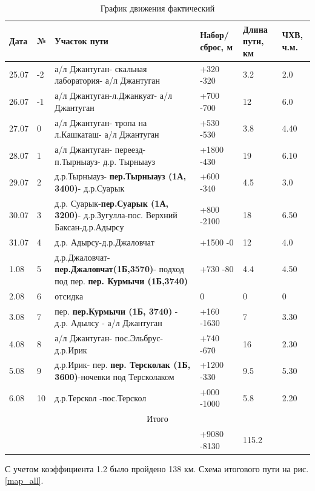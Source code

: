 \documentclass[]{article}
\begin{document}
\begin{table}[h!]
	\caption{\label{tab:grafik} График движения фактический}
	\begin{center}
		\begin{tabular}{|p{0.7cm}|p{0.3cm}|p{5cm}|p{0.9cm}|p{1cm}|p{1cm}|}
			\hline
			Дата&№& Участок пути & Набор/ сброс, м & Длина пути, км & ЧХВ, ч.м.\\ \hline
			25.07&-2&а/л Джантуган- скальная лаборатория- а/л Джантуган&+320 -320 & 3.2 & 2.0\\ \hline
			26.07&-1&а/л Джантуган-л.Джанкуат- а/л Джантуган&+700 -700 & 12 & 6.0\\ \hline
			27.07&0&а/л Джантуган- тропа на л.Кашкаташ- а/л Джантуган&+530 -530 & 3.8 & 4.40\\ \hline
			28.07&1&а/л Джантуган- переезд- п.Тырныауз- д.р. Тырныауз&+1800 -430 & 19 & 6.10\\ \hline
			29.07&2&д.р.Тырныауз- \textbf{пер.Тырныауз (1А, 3400)}- д.р.Суарык &+600 -340 & 4.5 & 3.0\\ \hline
			30.07&3&д.р. Суарык-\textbf{пер.Суарык (1А, 3200)}- д.р.Зугулла-пос. Верхний Баксан-д.р.Адырсу &+800 -2100 & 18 & 6.50\\ \hline
			31.07&4&д.р. Адырсу-д.р.Джаловчат &+1500 -0 & 12 & 4.0\\ \hline
			1.08&5&д.р.Джаловчат- \textbf{пер.Джаловчат(1Б,3570)}- подход под пер. \textbf{пер. Курмычи (1Б,3740)} &+730 -80 & 4.4 & 4.50\\ \hline
			2.08&6&отсидка &0 & 0 & 0\\ \hline
			3.08&7&пер. \textbf{пер.Курмычи (1Б, 3740)} - д.р. Адылсу - а/л Джантуган &+160 -1630 & 7 & 3.30\\ \hline
			4.08&8& а/л Джантуган- пос.Эльбрус- д.р.Ирик &+740 -670 & 16 & 2.30\\ \hline
			5.08&9& д.р.Ирик- пер. \textbf{пер. Терсколак (1Б, 3600)}-ночевки под Терсколаком  &+1200 -330 & 9.5 & 5.30\\ \hline
			6.08&10& д.р.Терскол -пос.Терскол  &+000   -1000 & 5.8 & 2.20\\ \hline
			\multicolumn{6}{|c|}{Итого} \\ \hline
			&&&	+9080 -8130 &	115.2&		 \\ \hline	
			
		\end{tabular}
	\end{center}
\end{table}
С учетом коэффициента 1.2 было пройдено 138 км.
Схема итогового пути на рис.\ref{map_all}.
\end{document}
